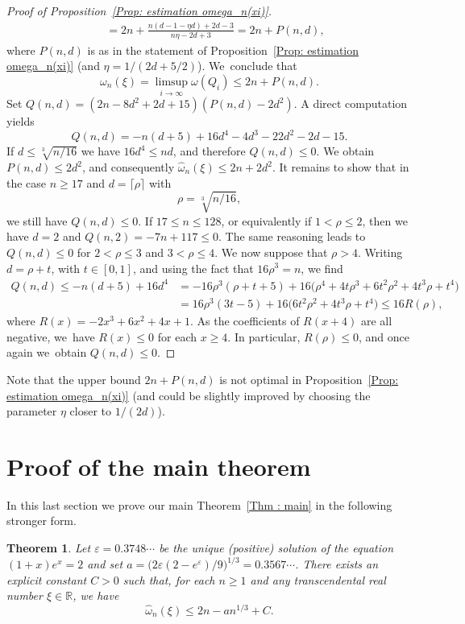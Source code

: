 \documentclass[JEP,XML,SOM,Unicode,NoFloatCountersInSection,published]{cedram}
\newcommand\bR{\mathbb{R}}
\newcommand\ee{\varepsilon}
\newcommand\homega{\widehat{\omega}}\newcommand\HH{\mathcal{H}}
\theoremstyle{definition}
\theoremstyle{plain}
\newtheorem{Thm}{Theorem}[section]
\begin{document}
\begin{proof}[Proof of Proposition~\ref{Prop: estimation omega_n(xi)}]
\begin{align*}
& \; = 2n + \frac{n(d-1-\eta d)+2d-3}{n\eta-2d+3} = 2n + P(n,d),
\end{align*}
where $P(n,d)$ is as in the statement of Proposition~\ref{Prop: estimation omega_n(xi)} (and $\eta=1/(2d+5/2)$). We~conclude that
\[
\omega_n(\xi) = \limsup_{i\to\infty} \omega(Q_i) \leq 2n+P(n,d).
\]
Set $Q(n,d) = (2n-8d^2+2d+15)(P(n,d)-2d^2)$. A direct computation yields
\begin{equation*}
Q(n,d) = -n(d+5)+16d^4-4d^3-22d^2-2d-15.
\end{equation*}
If $\displaystyle d\leq \sqrt[3]{n/16}$ we have $16d^4 \leq nd$, and therefore $Q(n,d)\leq 0$. We obtain $P(n,d)\leq 2d^2$, and consequently $\homega_n(\xi)\leq 2n+2d^2$. It remains to show that in the case $n\geq 17$ and $d= \lceil \rho \rceil$ with
\[
\rho = \sqrt[3]{n/16},
\]
we still have $Q(n,d)\leq 0$. If $17 \leq n \leq 128$, or equivalently if $1 < \rho \leq 2$, then we have $d=2$ and $Q(n,2) = -7n+117 \leq 0$. The same reasoning leads to $Q(n,d) \leq 0$ for $2 < \rho \leq 3$ and $3 < \rho \leq 4$. We now suppose that $\rho > 4$. Writing $d = \rho + t$, with $t\in [0,1]$, and using the fact that $16\rho^3 = n$, we find
\begin{align*}
Q(n,d) \leq -n(d+5)+16d^4 & = - 16\rho^3(\rho+t+5) + 16 \big(\rho^4 + 4t\rho^3 + 6t^2\rho^2 + 4t^3\rho +t^4 \big) \\
& = 16\rho^3(3t-5) + 16 \big(6t^2\rho^2 + 4t^3\rho +t^4 \big) \leq 16R(\rho),
\end{align*}
where $R(x) = -2x^3+6x^2+4x+1$. As the coefficients of $R(x+4)$ are all negative, we~have $R(x)\leq 0$ for each $x\geq 4$. In particular, $R(\rho)\leq 0$, and once again we~obtain $Q(n,d)\leq 0$.
\end{proof}

Note that the upper bound $2n+P(n,d)$ is not optimal in Proposition~\ref{Prop: estimation omega_n(xi)} (and could be slightly improved by choosing the parameter $\eta$ closer to $1/(2d)$).

\section{Proof of the main theorem}
\label{section: proof of main thm}

In this last section we prove our main Theorem~\ref{Thm : main} in the following stronger form.

\begin{Thm}
\label{Thm : main avec meilleure cst}
Let $\ee = 0.3748\cdots$ be the unique (positive) solution of the equation $(1+x)e^x = 2$ and set $a = \big(2\ee(2-e^\ee)/9\big)^{1/3} = 0.3567 \cdots$. There exists an explicit constant $C>0$ such that, for each $n\geq 1$ and any transcendental real number $\xi\in\bR$, we have
\begin{equation*}
\homega_n(\xi) \leq 2n- a n^{1/3} + C.
\end{equation*}
\end{Thm}
\end{document}
